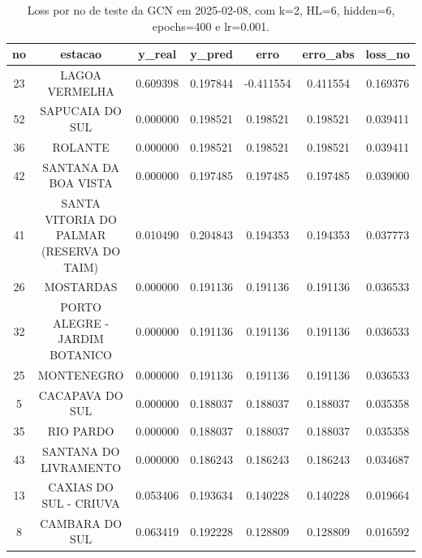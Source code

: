 \begin{table}[h]
\centering
\caption{Loss por no de teste da GCN em 2025-02-08, com k=2, HL=6, hidden=6, epochs=400 e lr=0.001.}
\label{tab:gcn_loss_k2_hl6_h6_e400_d20250208}
\begin{tabular}{ccccccc}
\toprule
no & estacao & y\_real & y\_pred & erro & erro\_abs & loss\_no \\
\midrule
23 & LAGOA VERMELHA & 0.609398 & 0.197844 & -0.411554 & 0.411554 & 0.169376 \\
52 & SAPUCAIA DO SUL & 0.000000 & 0.198521 & 0.198521 & 0.198521 & 0.039411 \\
36 & ROLANTE & 0.000000 & 0.198521 & 0.198521 & 0.198521 & 0.039411 \\
42 & SANTANA DA BOA VISTA & 0.000000 & 0.197485 & 0.197485 & 0.197485 & 0.039000 \\
41 & SANTA VITORIA DO PALMAR (RESERVA DO TAIM) & 0.010490 & 0.204843 & 0.194353 & 0.194353 & 0.037773 \\
26 & MOSTARDAS & 0.000000 & 0.191136 & 0.191136 & 0.191136 & 0.036533 \\
32 & PORTO ALEGRE - JARDIM BOTANICO & 0.000000 & 0.191136 & 0.191136 & 0.191136 & 0.036533 \\
25 & MONTENEGRO & 0.000000 & 0.191136 & 0.191136 & 0.191136 & 0.036533 \\
5 & CACAPAVA DO SUL & 0.000000 & 0.188037 & 0.188037 & 0.188037 & 0.035358 \\
35 & RIO PARDO & 0.000000 & 0.188037 & 0.188037 & 0.188037 & 0.035358 \\
43 & SANTANA DO LIVRAMENTO & 0.000000 & 0.186243 & 0.186243 & 0.186243 & 0.034687 \\
13 & CAXIAS DO SUL - CRIUVA & 0.053406 & 0.193634 & 0.140228 & 0.140228 & 0.019664 \\
8 & CAMBARA DO SUL & 0.063419 & 0.192228 & 0.128809 & 0.128809 & 0.016592 \\
\bottomrule
\end{tabular}
\end{table}
